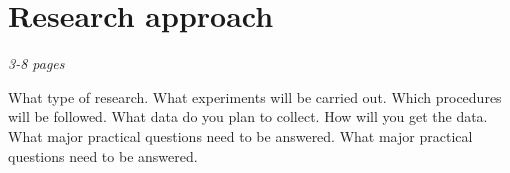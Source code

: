 \chapter{Research approach}
\label{ch:approach}
\textit{3-8 pages}

What type of research.
What experiments will be carried out.
Which procedures will be followed.
What data do you plan to collect.
How will you get the data.
What major practical questions need to be answered.
What major practical questions need to be answered.